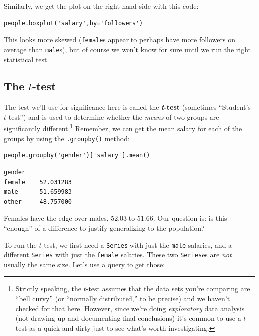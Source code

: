 Similarly, we get the plot on the right-hand side with this code:

\begin{Verbatim}[fontsize=\small,samepage=true,frame=single,framesep=3mm]
people.boxplot('salary',by='followers')
\end{Verbatim}

This looks more skewed (\texttt{female}s appear to perhaps have more followers
on average than \texttt{male}s), but of course we won't know for sure until we
run the right statistical test.

\subsection{The $t$-test}


The test we'll use for significance here is called the \textbf{\textit{t}-test}
(sometimes ``Student's $t$-test'') and is used to determine whether the
\textit{means} of two groups are significantly different.\footnote{Strictly
speaking, the $t$-test assumes that the data sets you're comparing are ``bell
curvy'' (or ``normally distributed,'' to be precise) and we haven't checked for
that here. However, since we're doing \textit{exploratory} data analysis (not
drawing up and documenting final conclusions) it's common to use a $t$-test as
a quick-and-dirty just to see what's worth investigating.} Remember, we can get
the mean salary for each of the groups by using the \texttt{.groupby()} method:

\begin{Verbatim}[fontsize=\small,samepage=true,frame=single,framesep=3mm]
people.groupby('gender')['salary'].mean()
\end{Verbatim}
\vspace{-.2in}

\begin{Verbatim}[fontsize=\small,samepage=true,frame=leftline,framesep=5mm,framerule=1mm]
gender
female    52.031283
male      51.659983
other     48.757000
\end{Verbatim}

Females have the edge over males, 52.03 to 51.66. Our question is: is this
``enough'' of a difference to justify generalizing to the population?

To run the $t$-test, we first need a \texttt{Series} with just the
\texttt{male} salaries, and a different \texttt{Series} with just the
\texttt{female} salaries. These two \texttt{Series}es are \textit{not} usually
the same size. Let's use a query to get those:

